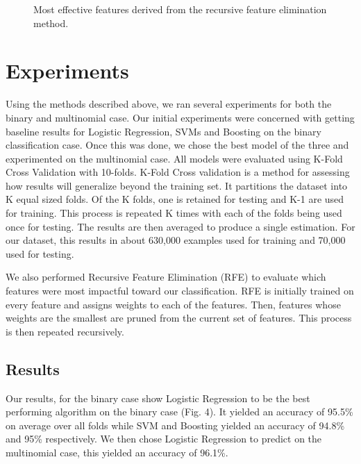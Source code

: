\documentclass[conference]{IEEEtran}
\begin{document}
\begin{figure}[!htb]
\begin{center}
\end{center}
\caption{Most effective features derived from the recursive feature elimination method.}
\end{figure}

\section{Experiments}

Using the methods described above, we ran several experiments for both the binary and multinomial case. Our initial experiments were concerned with getting baseline results for Logistic Regression, SVMs and Boosting on the binary classification case. Once this was done, we chose the best model of the three and experimented on the multinomial case. All models were evaluated using K-Fold Cross Validation with 10-folds. K-Fold Cross validation is a method for assessing how results will generalize beyond the training set. It partitions the dataset into K equal sized folds. Of the K folds, one is retained for testing and K-1 are used for training. This process is repeated K times with each of the folds being used once for testing. The results are then averaged to produce a single estimation. For our dataset, this results in about 630,000 examples used for training and 70,000 used for testing.

We also performed Recursive Feature Elimination (RFE) to evaluate which features were most impactful toward our classification. RFE is initially trained on every feature and assigns weights to each of the features. Then, features whose weights are the smallest are pruned from the current set of features. This process is then repeated recursively.

\subsection{Results}
Our results, for the binary case show Logistic Regression to be the best performing algorithm on the binary case (Fig. 4). It yielded an accuracy of 95.5\% on average over all folds while SVM and Boosting yielded an accuracy of 94.8\% and 95\% respectively. We then chose Logistic Regression to predict on the multinomial case, this yielded an accuracy of 96.1\%.
\end{document}
